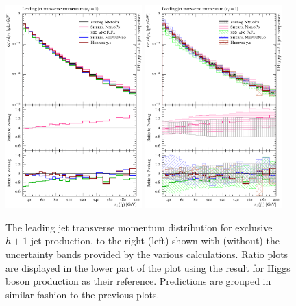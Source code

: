 \begin{figure}[t!]
  \centering
  \includegraphics[width=0.47\textwidth]{figures/hjetscomp_u_jet1_pT_excl.pdf}
  \hfill
  \includegraphics[width=0.47\textwidth]{figures/hjetscomp_jet1_pT_excl.pdf}
  \caption{\label{fig:hjetscomp:results:1obs:j1pt_excl}%
    The leading jet transverse momentum distribution for exclusive
    $h+1$-jet production, to the right (left) shown with (without)
    the uncertainty bands provided by the various calculations. Ratio
    plots are displayed in the lower part of the plot using the
    \hjetscompPowheg \hjetscompNNLOPS result for Higgs boson production as their
    reference. Predictions are grouped in similar fashion to the
    previous plots.}
\end{figure}

